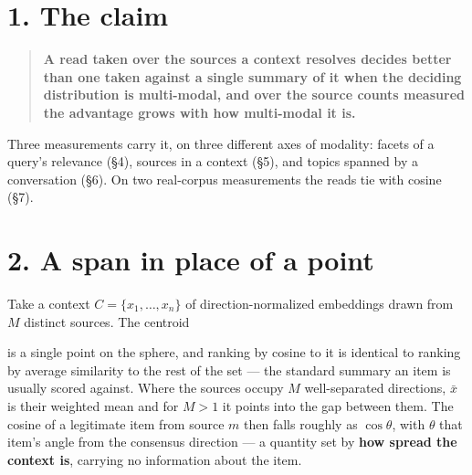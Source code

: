 \documentclass[10pt,letterpaper,twocolumn]{article}
\begin{document}
\ifdim\dimexpr\ht\typesetfront+\dp\typesetfront+10\baselineskip\relax<\textheight
  \twocolumn[\unvbox\typesetfront]
\else
  \twocolumn[\unvbox\typesettitle\typesetrule]
  {\centering\small\bfseries Abstract\par}\vspace{0.6ex}
  {\small\setlength{\parskip}{0.5ex}\noindent\typesetabstract\par}
  \typesetrule
\fi
\makeatother

\section{1. The claim}\label{1-the-claim}

\begin{quote}
\textbf{A read taken over the sources a context resolves decides better than one taken against a
single summary of it when the deciding distribution is multi-modal, and over the source counts
measured the advantage grows with how multi-modal it is.}
\end{quote}

Three measurements carry it, on three different axes of modality: facets of a query's relevance
(§4), sources in a context (§5), and topics spanned by a conversation (§6). On two real-corpus
measurements the reads tie with cosine (§7).

\section{2. A span in place of a point}\label{2-a-span-in-place-of-a-point}

Take a context \(C = \{x_1, \dots, x_n\}\) of direction-normalized embeddings drawn from \(M\)
distinct sources. The centroid


is a single point on the sphere, and ranking by cosine to it is identical to ranking by average
similarity to the rest of the set --- the standard summary an item is usually scored against.
Where the sources occupy \(M\) well-separated directions, \(\bar{x}\) is their weighted mean and for
\(M > 1\) it points into the gap between them. The cosine of a legitimate item from source \(m\)
then falls roughly as \(\cos\theta\), with \(\theta\) that item's angle from the consensus
direction --- a quantity set by \textbf{how spread the context is}, carrying no information about the
item.
\end{document}
